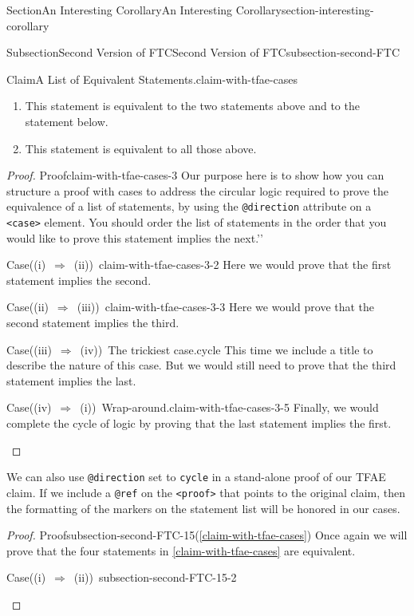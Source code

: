 \documentclass[twoside,10pt,]{article}
\newcommand{\xreffont}{\relax}
\newcommand{\mono}[1]{\texttt{#1}}
\DeclareRobustCommand{\acronymintitle}[1]{\texorpdfstring{#1}{#1}}
\numberwithin{equation}{section}
\begin{document}
\begin{sectionptx}{Section}{An Interesting Corollary}{}{An Interesting Corollary}{}{}{section-interesting-corollary}
\begin{subsectionptx}{Subsection}{Second Version of \acronymintitle{FTC}}{}{Second Version of \acronymintitle{FTC}}{}{}{subsection-second-FTC}
\begin{claim}{Claim}{A List of Equivalent Statements.}{}{claim-with-tfae-cases}
\begin{enumerate}[label={(\roman*)}]
\item{}This statement is equivalent to the two statements above and to the statement below.%
\item{}This statement is equivalent to all those above.%
\end{enumerate}
%
\end{claim}
\begin{proof}{Proof}{}{claim-with-tfae-cases-3}
Our purpose here is to show how you can structure a proof with cases to address the circular logic required to prove the equivalence of a list of statements, by using the \mono{@direction} attribute on a \mono{<case>} element. You should order the list of statements in the order that you would like to prove \textasciigrave{}\textasciigrave{}this statement implies the next.'{}'{}%
\begin{case}{Case}{((i) $\Rightarrow$ (ii)) }{}{claim-with-tfae-cases-3-2}
Here we would prove that the first statement implies the second.%
\end{case}
\begin{case}{Case}{((ii) $\Rightarrow$ (iii)) }{}{claim-with-tfae-cases-3-3}
Here we would prove that the second statement implies the third.%
\end{case}
\begin{case}{Case}{((iii) $\Rightarrow$ (iv)) }{The trickiest case.}{cycle}
This time we include a title to describe the nature of this case. But we would still need to prove that the third statement implies the last.%
\end{case}
\begin{case}{Case}{((iv) $\Rightarrow$ (i)) }{Wrap-around.}{claim-with-tfae-cases-3-5}
Finally, we would complete the cycle of logic by proving that the last statement implies the first.%
\end{case}
\end{proof}
We can also use \mono{@direction} set to \mono{cycle} in a stand-alone proof of our TFAE claim. If we include a \mono{@ref} on the \mono{<proof>} that points to the original claim, then the formatting of the markers on the statement list will be honored in our cases.%
\begin{proof}{Proof}{}{subsection-second-FTC-15}\space(\hyperref[claim-with-tfae-cases]{{\xreffont\ref{claim-with-tfae-cases}}})\space
Once again we will prove that the four statements in \hyperref[claim-with-tfae-cases]{{\xreffont\ref{claim-with-tfae-cases}}} are equivalent.%
\begin{case}{Case}{((i) $\Rightarrow$ (ii)) }{}{subsection-second-FTC-15-2}

\end{case}
\end{proof}
\end{subsectionptx}
\end{sectionptx}
\end{document}
